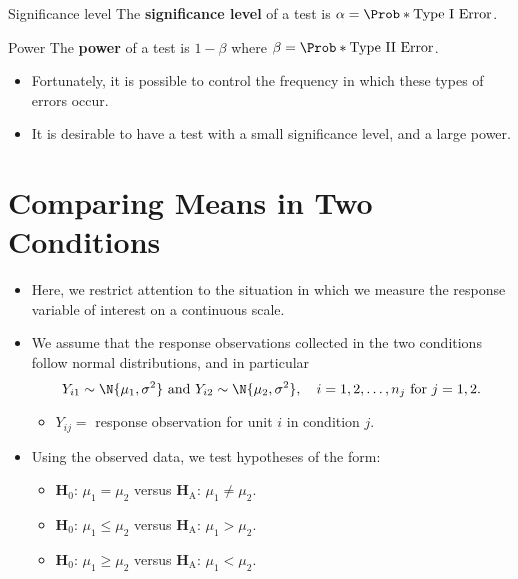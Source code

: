 \begin{Definition}{Significance level}{}
    The \textbf{significance level} of a test is $ \alpha=\Prob*{\text{Type I Error}} $.
\end{Definition}
\begin{Definition}{Power}{}
    The \textbf{power} of a test is $ 1-\beta $ where
    $ \beta=\Prob*{\text{Type II Error}} $.
\end{Definition}
\begin{itemize}
    \item Fortunately, it is possible to control the frequency in which these types of errors
          occur.
    \item It is desirable to have a test with a small significance level, and a large power.
\end{itemize}
\section{Comparing Means in Two Conditions}
\begin{itemize}
    \item Here, we restrict attention to the situation in which we measure the response variable
          of interest on a continuous scale.
    \item We assume that the response observations collected in the two conditions follow normal
          distributions, and in particular
          \[ Y_{i1}\sim \N{\mu_1,\sigma^2}\text{ and }Y_{i2} \sim \N{\mu_2,\sigma^2},\quad i=1,2,\ldots,n_j\text{ for } j=1,2. \]
          \begin{itemize}
              \item $ Y_{ij}= $ response observation for unit $ i $ in condition $ j $.
          \end{itemize}
    \item Using the observed data, we test hypotheses of the form:
          \begin{itemize}
              \item $ \mathbf{H}_0 $: $ \mu_1=\mu_2 $ versus $ \mathbf{H}_\text{A} $: $ \mu_1\ne\mu_2 $.
              \item $ \mathbf{H}_0 $: $ \mu_1\le\mu_2 $ versus $ \mathbf{H}_\text{A} $: $ \mu_1>\mu_2 $.
              \item $ \mathbf{H}_0 $: $ \mu_1\ge\mu_2 $ versus $ \mathbf{H}_\text{A} $: $ \mu_1<\mu_2 $.
          \end{itemize}
\end{itemize}

